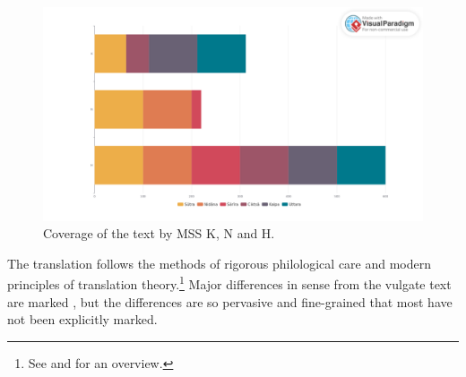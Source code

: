         \begin{figure}[t]
            \centering
            \includegraphics[width=\textwidth]{"media/MSS 1 visual paradigm.art"}
            \caption{Coverage of the text by MSS K, N and H.}
            \label{fig:mss-1-visual-paradigm}
        \end{figure}
        
    
    
The translation follows the methods of rigorous philological care and 
modern principles of translation theory.\footnote{See 
\cite[intro.]{wuja-2003} and \cite[81--83]{wuja-2021} for an overview.}  Major 
differences in sense from the vulgate text are marked  , but the differences are so pervasive and fine-grained that most have not 
been explicitly marked.

